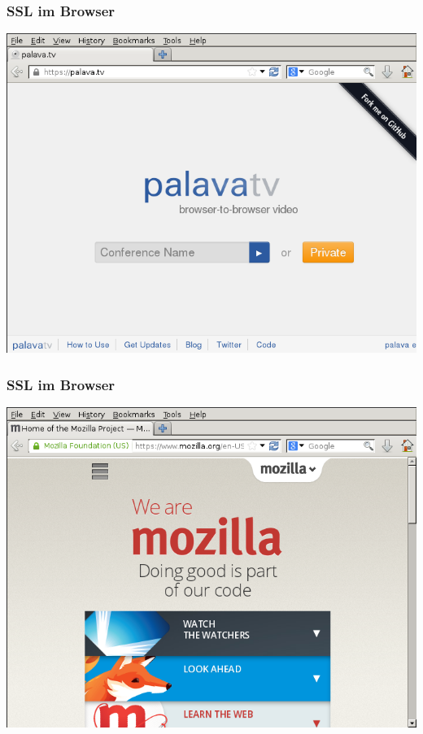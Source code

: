 \documentclass[12pt]{beamer}
\begin{document}
\begin{frame}
    \frametitle{SSL im Browser}
    \includegraphics[height=0.7\textheight]{img/ssl_verified.png}
\end{frame}

\begin{frame}
    \frametitle{SSL im Browser}
    \includegraphics[height=0.7\textheight]{img/ssl_special.png}
\end{frame}
\end{document}
